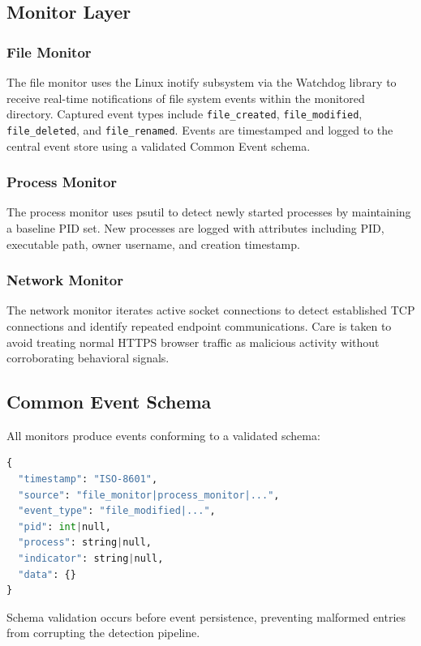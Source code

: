 \documentclass[conference]{IEEEtran}
\begin{document}
\subsection{Monitor Layer}

\subsubsection{File Monitor}
The file monitor uses the Linux inotify subsystem via the
Watchdog library to receive real-time notifications of file
system events within the monitored directory. Captured event
types include \texttt{file\_created}, \texttt{file\_modified},
\texttt{file\_deleted}, and \texttt{file\_renamed}. Events
are timestamped and logged to the central event store using
a validated Common Event schema.

\subsubsection{Process Monitor}
The process monitor uses psutil to detect newly started
processes by maintaining a baseline PID set. New processes
are logged with attributes including PID, executable path,
owner username, and creation timestamp.

\subsubsection{Network Monitor}
The network monitor iterates active socket connections to
detect established TCP connections and identify repeated
endpoint communications. Care is taken to avoid treating
normal HTTPS browser traffic as malicious activity without
corroborating behavioral signals.

\subsection{Common Event Schema}

All monitors produce events conforming to a validated schema:
\begin{lstlisting}[language=Python, basicstyle=\scriptsize\ttfamily,
  caption={Common Event schema fields},
  frame=single, numbers=none]
{
  "timestamp": "ISO-8601",
  "source": "file_monitor|process_monitor|...",
  "event_type": "file_modified|...",
  "pid": int|null,
  "process": string|null,
  "indicator": string|null,
  "data": {}
}
\end{lstlisting}

Schema validation occurs before event persistence, preventing
malformed entries from corrupting the detection pipeline.
\end{document}
